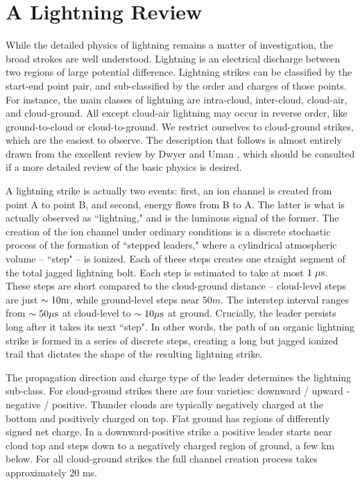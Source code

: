 \documentclass[%
 reprint,
 amsmath,amssymb,
 aps,
 nofootinbib, %
]{revtex4-2}
\begin{document}


\section{A Lightning Review} %
\label{sec:a_lightning_review}

    While the detailed physics of lightning remains a matter of investigation, the broad strokes are well understood. Lightning is an electrical discharge between two regions of large potential difference. Lightning strikes can be classified by the start-end point pair, and sub-classified by the order and charges of those points. For instance, the main classes of lightning are intra-cloud, inter-cloud, cloud-air, and cloud-ground. All except cloud-air lightning may occur in reverse order, like ground-to-cloud or cloud-to-ground. We restrict ourselves to cloud-ground strikes, which are the easiest to observe. The description that follows is almost entirely drawn from the excellent review by Dwyer and Uman \citep{DwyerUman2014}, which should be consulted if a more detailed review of the basic physics is desired.

    A lightning strike is actually two events: first, an ion channel is created from point A to point B, and second, energy flows from B to A. The latter is what is actually observed as ``lightning," and is the luminous signal of the former. The creation of the ion channel under ordinary conditions is a discrete stochastic process of the formation of ``stepped leaders," where a cylindrical atmospheric volume -- ``step" -- is ionized. Each of these steps creates one straight segment of the total jagged lightning bolt. Each step is estimated to take at most $1 \; \mu\rm{s}$. These steps are short compared to the cloud-ground distance -- cloud-level steps are just $\sim10 \rm{m}$, while ground-level steps near $50 m$. The interstep interval ranges from $\sim50 \mu\rm{s}$ at cloud-level to $\sim10 \mu\rm{s}$ at ground. Crucially, the leader persists long after it takes its next ``step". In other words, the path of an organic lightning strike is formed in a series of discrete steps, creating a long but jagged ionized trail that dictates the shape of the resulting lightning strike.

    The propagation direction and charge type of the leader determines the lightning sub-class. For cloud-ground strikes there are four varieties: downward / upward - negative / positive. Thunder clouds are typically negatively charged at the bottom and positively charged on top. Flat ground has regions of differently signed net charge. In a downward-positive strike a positive leader starts near cloud top and steps down to a negatively charged region of ground, a few km below. For all cloud-ground strikes the full channel creation process takes approximately $20$ ms.
\end{document}
